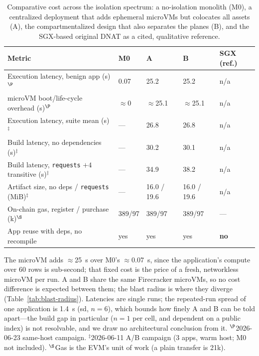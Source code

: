 \begin{table}[htbp]
\centering
\caption{Comparative cost across the isolation spectrum: a no-isolation monolith (M0), a
centralized deployment that adds ephemeral microVMs but colocates all assets (A), the
compartmentalized design that also separates the planes (B), and the SGX-based original
DNAT as a cited, qualitative reference.}
\label{tab:comparison}
\footnotesize
\begin{tabularx}{\textwidth}{@{}Xllll@{}}
\toprule
Metric & M0 & A & B & SGX (ref.) \\
\midrule
Execution latency, benign app (s)$^{\P}$ & 0.07 & 25.2 & 25.2 & n/a \\
microVM boot/life-cycle overhead (s)$^{\P}$ & $\approx$0 & $\approx$25.1 & $\approx$25.1 & n/a \\
\addlinespace
Execution latency, suite mean (s)$^{\ddagger}$ & --- & 26.8 & 26.8 & n/a \\
Build latency, no dependencies (s)$^{\ddagger}$ & --- & 30.2 & 30.1 & n/a \\
Build latency, \texttt{requests} $+4$ transitive (s)$^{\ddagger}$ & --- & 34.9 & 38.2 & n/a \\
Artifact size, no deps / \texttt{requests} (MiB)$^{\ddagger}$ & --- & 16.0 / 19.6 & 16.0 / 19.6 & n/a \\
\addlinespace
On-chain gas, register / purchase (k)$^{\S}$ & 389/97 & 389/97 & 389/97 & --- \\
\addlinespace
App reuse with deps, no recompile & yes & yes & yes & \textbf{no} \\
\bottomrule
\end{tabularx}
\par\smallskip
\parbox{\textwidth}{\footnotesize The microVM adds $\approx$25~s over M0's $\approx$0.07~s,
since the application's compute over 60 rows is sub-second; that fixed cost is the price of
a fresh, networkless microVM per run. A and B share the same Firecracker microVMs, so no
cost difference is expected between them; the blast radius is where they diverge
(Table~\ref{tab:blast-radius}). Latencies are single runs; the repeated-run spread of one
application is 1.4~s (sd, $n{=}6$), which bounds how finely A and B can be told apart---the
build gap in particular ($n{=}1$ per cell, and dependent on a public index) is not
resolvable, and we draw no architectural conclusion from it. $^{\P}$2026-06-23 same-host
campaign. $^{\ddagger}$2026-06-11 A/B campaign (3 apps, warm host; M0 not included).
$^{\S}$Gas is the EVM's unit of work (a plain transfer is 21k).}
\end{table}

